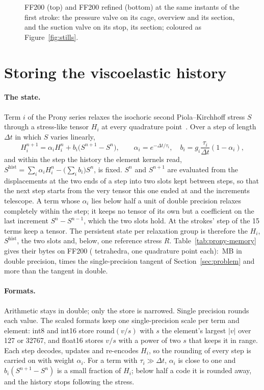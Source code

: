\documentclass[sigconf,nonacm]{acmart}
\begin{document}
\begin{figure}
\centering

\caption{FF200 (top) and FF200 refined (bottom) at the same instants of the first stroke: the
pressure valve on its cage, overview and its section, and the suction valve on its stop, its
section; coloured as Figure~\ref{fig:stills}.}
\label{fig:resolutions}
\end{figure}


\section{Storing the viscoelastic history}
\label{sec:history}

\paragraph{The state.} Term $i$ of the Prony series relaxes the isochoric second Piola--Kirchhoff
stress $S$ through a stress-like tensor $H_i$ at every quadrature point~\cite{simo1987}. Over a
step of length $\Delta t$ in which $S$ varies linearly,
\begin{equation}
  H_i^{n+1} = \alpha_i H_i^n + b_i\bigl(S^{n+1} - S^n\bigr),\qquad
  \alpha_i = e^{-\Delta t/\tau_i},\quad b_i = g_i\frac{\tau_i}{\Delta t}(1-\alpha_i),
  \label{eq:prony}
\end{equation}
and within the step the history the element kernels read,
$S^{\mathrm{hist}} = \sum_i\alpha_iH_i^n - \bigl(\sum_ib_i\bigr)S^n$, is fixed. $S^n$ and $S^{n+1}$
are evaluated from the displacements at the two ends of a step into two slots kept between steps,
so that the next step starts from the very tensor this one ended at and the increments telescope.
A term whose $\alpha_i$ lies below half a unit of double precision relaxes completely within the
step; it keeps no tensor of its own but a coefficient on the last increment $S^n-S^{n-1}$, which the
two slots hold. At the strokes' step \hsStored{} of the 15 terms keep a tensor. The persistent state
per relaxation group is therefore the $H_i$, $S^{\mathrm{hist}}$, the two slots and, below, one
reference stress $R$. Table~\ref{tab:prony-memory} gives their bytes on FF200 (\hsElements{}
tetrahedra, one quadrature point each): \hsStateFullMB\,MB in double precision,
\hsStateOverTangent{} times the single-precision tangent of Section~\ref{sec:problem} and more than
the tangent in double.

\paragraph{Formats.} Arithmetic stays in double; only the store is narrowed. Single precision
rounds each value. The scaled formats keep one single-precision scale per term and element: int8
and int16 store $\mathrm{round}(v/s)$ with $s$ the element's largest $|v|$ over 127 or 32767, and
float16 stores $v/s$ with a power of two $s$ that keeps it in range. Each step decodes, updates and
re-encodes $H_i$, so the rounding of every step is carried on with weight $\alpha_i$. For a term
with $\tau_i\gg\Delta t$, $\alpha_i$ is close to one and $b_i(S^{n+1}-S^n)$ is a small fraction of $H_i$;
below half a code it is rounded away, and the history stops following the stress.
\end{document}
